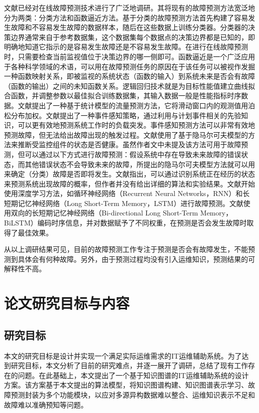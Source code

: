 文献\parencite{salfner2010survey}已经对在线故障预测技术进行了广泛地调研。其将现有的故障预测方法宽泛地分为两类：分类方法和函数逼近方法。基于分类的故障预测方法\cite{tan2012prepare,pitakrat2018hora,zhang2018prefix,baldoni2015line}首先构建了容易发生故障和不容易发生故障的数据样本，随后在这些数据上训练分类器。分类器的决策边界通常来自于参考数据集，这个数据集每个数据点的决策边界都是已知的，即明确地知道它指示的是容易发生故障还是不容易发生故障。在进行在线故障预测时，只需要检查当前监视值位于决策边界的哪一侧即可。函数逼近是一个广泛应用于各种科学领域的术语，可以用在故障预测任务的原因在于该任务可以被视作发掘一种函数映射关系，即被监视的系统状态（函数的输入）到系统未来是否会有故障（函数的输出）之间的未知函数关系。逻辑回归技术就是为目标性能值建立曲线拟合函数，并调整参数以最佳拟合训练数据集，其输入数据一般是性能指标时序数据\cite{salfner2010survey}。文献\parencite{dalmazo2013predicting}提出了一种基于统计模型的流量预测方法，它将滑动窗口内的观测值用泊松分布加权。文献\parencite{sladescu2012event}提出了一种事件感知策略，通过利用与计划事件相关的先验知识，可以更有效地预测系统工作时的负载突发。事件感知预测方法可以非常有效地预测故障，但无法给出故障出现的触发过程。文献\parencite{purushotham2005multi}使用了基于隐马尔可夫模型的方法来推断受监控组件的状态是否健康。虽然作者文中未提及该方法可用于故障预测，但可以通过以下方式进行故障预测：假设系统中存在导致未来故障的错误状态，而其他错误状态不会导致未来的故障，所提出的隐马尔可夫模型方法就可以用来确定（分类）故障是否即将发生。文献\parencite{boutros2011detection}指出，可以通过识别系统正在经历的状态来预测系统出现故障的概率，但作者并没有给出详细的算法和实验结果。文献\parencite{xu2016health,cheng2018machine,du2017deeplog,das2018desh,islam2017predicting,li2020predicting}开始使用深度学习方法，如循环神经网络（Recurrent Neural Networks，RNN）和长短期记忆神经网络（Long Short-Term Memory，LSTM）进行故障预测。文献\parencite{gao2020task}使用双向的长短期记忆神经网络（Bi-directional Long Short-Term Memory，BiLSTM）编码时序信息，并对数据赋予了不同权重，在预测是否会发生故障时取得了最佳效果。

从以上调研结果可见，目前的故障预测工作专注于预测是否会有故障发生，不能预测到具体会有何种故障。另外，由于预测过程均没有引入运维知识，预测结果的可解释性不高。
\section{论文研究目标与内容}
\subsection{研究目标}
本文的研究目标是设计并实现一个满足实际运维需求的IT运维辅助系统。为了达到研究目标，本文分析了目前的研究难点，并逐一展开了调研，总结了现有工作存在的问题。在此基础上，本文提出了一个基于知识图谱的IT运维辅助系统的设计方案。该方案基于本文提出的算法模型，将知识图谱构建、知识图谱表示学习、故障预测封装为多个功能模块，以应对多源异构数据难以整合、运维知识表示不足和故障难以准确预知等问题。

